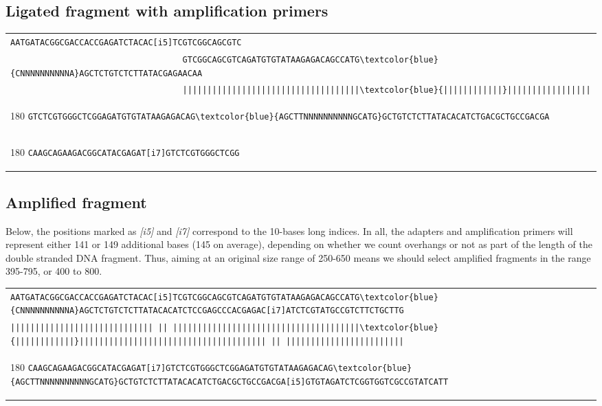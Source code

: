 \documentclass[a4paper,12pt]{article}
\begin{document}
\begin{flushleft}
\subsection*{Ligated fragment with amplification primers}
\begin{tabular}{l}
\Verb+AATGATACGGCGACCACCGAGATCTACAC[i5]TCGTCGGCAGCGTC+\\[-8pt]
\Verb+                                   GTCGGCAGCGTCAGATGTGTATAAGAGACAGCCATG\textcolor{blue}{CNNNNNNNNNNA}AGCTCTGTCTCTTATACGAGAACAA+\\[-6pt]
\Verb+                                   ||||||||||||||||||||||||||||||||||||\textcolor{blue}{||||||||||||}|||||||||||||||||+\\[-10pt]
   \begin{turn}{180}
   \Verb+GTCTCGTGGGCTCGGAGATGTGTATAAGAGACAG\textcolor{blue}{AGCTTNNNNNNNNNNGCATG}GCTGTCTCTTATACACATCTGACGCTGCCGACGA                                 +
   \end{turn}
\\[-8pt]
   \begin{turn}{180}
   \Verb+CAAGCAGAAGACGGCATACGAGAT[i7]GTCTCGTGGGCTCGG                                                                                                          +
   \end{turn}
\\
\end{tabular}
\vspace*{0.3cm}

\subsection*{Amplified fragment}
Below, the positions marked as \emph{[i5]} and \emph{[i7]} correspond to the 10-bases long indices. In all, the adapters and amplification primers will represent either 141 or 149 additional bases (145 on average), depending on whether we count overhangs or not as part of the length of the double stranded DNA fragment. Thus, aiming at an original size range of 250-650 means we should select amplified fragments in the range 395-795, or 400 to 800.

\begin{tabular}{l}
\Verb+AATGATACGGCGACCACCGAGATCTACAC[i5]TCGTCGGCAGCGTCAGATGTGTATAAGAGACAGCCATG\textcolor{blue}{CNNNNNNNNNNA}AGCTCTGTCTCTTATACACATCTCCGAGCCCACGAGAC[i7]ATCTCGTATGCCGTCTTCTGCTTG+\\[-8pt]
\Verb+||||||||||||||||||||||||||||| || ||||||||||||||||||||||||||||||||||||||\textcolor{blue}{||||||||||||}|||||||||||||||||||||||||||||||||||||| || ||||||||||||||||||||||||+\\[-10pt]
\begin{turn}{180}
\Verb+CAAGCAGAAGACGGCATACGAGAT[i7]GTCTCGTGGGCTCGGAGATGTGTATAAGAGACAG\textcolor{blue}{AGCTTNNNNNNNNNNGCATG}GCTGTCTCTTATACACATCTGACGCTGCCGACGA[i5]GTGTAGATCTCGGTGGTCGCCGTATCATT+
\end{turn}
\\
\end{tabular}


\end{flushleft}
\end{document}
